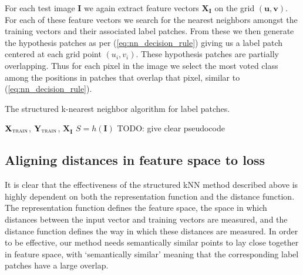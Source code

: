 \documentclass[a4paper,titlepage]{article}
\renewcommand{\vec}[1]{\mathbf{#1}}
\newcommand{\mat}[1]{\mathbf{#1}}
\begin{document}
For each test image $\mat{I}$ we again extract feature vectors $\mat{X}_\mat{I}$ on the grid $(\vec{u}, \vec{v})$. For each of these feature vectors we search for the nearest neighbors amongst the training vectors and their associated label patches. From these we then generate the hypothesis patches as per (\ref{eq:nn_decision_rule}) giving us a label patch centered at each grid point $(u_i, v_i)$. These hypothesis patches are partially overlapping. Thus for each pixel in the image we select the most voted class among the positions in patches that overlap that pixel, similar to (\ref{eq:nn_decision_rule}).

\begin{algorithm}
\caption{The structured k-nearest neighbor algorithm for label patches.}
\label{alg:structured_kNN}
\begin{algorithmic}[1]
\REQUIRE  $\mat{X}_\textsc{train}$, $\mat{Y}_\textsc{train}$, $\mat{X}_\mat{I}$ 
\ENSURE $S = h(\mat{I})$
\STATE TODO: give clear pseudocode
\end{algorithmic}
\end{algorithm}

\subsection{Aligning distances in feature space to loss}

It is clear that the effectiveness of the structured \ac{kNN} method described above is highly dependent on both the representation function and the distance function. The representation function defines the feature space, the space in which distances between the input vector and training vectors are measured, and the distance function defines the way in which these distances are measured. In order to be effective, our method needs semantically similar points to lay close together in feature space, with `semantically similar' meaning that the corresponding label patches have a large overlap.
\end{document}
